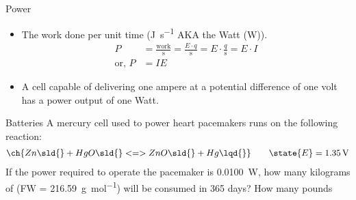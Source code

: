 \documentclass[notes=show]{beamer}
\begin{document}

\begin{frame}{Power}
	\begin{itemize}
		\item The work done per unit time (\si{\joule\per\second} AKA
			the Watt (\si{\watt})).
			\begin{align*}
				P &= \frac{\text{work}}{\si{\second}} = \frac{E
				\cdot q}{\si{\second}} = E \cdot
				\frac{q}{\si{\second}} = E \cdot I \\
				\text{or,~} P &= IE
			\end{align*}
		\item A cell capable of delivering one ampere at a potential
			difference of one volt has a power output of one Watt.
	\end{itemize}
\end{frame}


\begin{frame}[t]{Batteries}%
	A mercury cell used to power heart pacemakers runs on the following
	reaction:
	\begin{align*}
		\ch{Zn\sld{} + HgO\sld{} <=> ZnO\sld{} + Hg\lqd{}} \qquad
		\state{E} = \SI{1.35}{\volt}
	\end{align*}
	If the power required to operate the pacemaker is \SI{0.0100}{\watt},
	how many kilograms of  (FW = \SI{216.59}{\gram\per\mole}) will
	be consumed in 365 days? How many pounds 
\end{frame}

\end{document}
